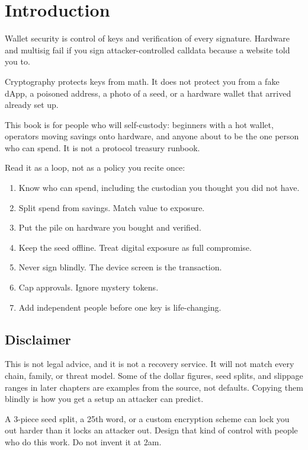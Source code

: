 \chapter{Introduction}

Wallet security is control of keys and verification of
every signature. Hardware and multisig fail if you sign
attacker-controlled calldata because a website told you
to.

Cryptography protects keys from math. It does not
protect you from a fake dApp, a poisoned address, a
photo of a seed, or a hardware wallet that arrived
already set up.

This book is for people who will self-custody: beginners
with a hot wallet, operators moving savings onto
hardware, and anyone about to be the one person who can
spend. It is not a protocol treasury runbook.

Read it as a loop, not as a policy you recite once:

\begin{enumerate}
  \item Know who can spend, including the custodian you
  thought you did not have.
  \item Split spend from savings. Match value to
  exposure.
  \item Put the pile on hardware you bought and verified.
  \item Keep the seed offline. Treat digital exposure as
  full compromise.
  \item Never sign blindly. The device screen is the
  transaction.
  \item Cap approvals. Ignore mystery tokens.
  \item Add independent people before one key is
  life-changing.
\end{enumerate}

\section{Disclaimer}

This is not legal advice, and it is not a recovery
service. It will not match every chain, family, or
threat model. Some of the dollar figures, seed splits,
and slippage ranges in later chapters are examples from
the source, not defaults. Copying them blindly is how
you get a setup an attacker can predict.

A 3-piece seed split, a 25th word, or a custom
encryption scheme can lock you out harder than it locks
an attacker out. Design that kind of control with people
who do this work. Do not invent it at 2am.

